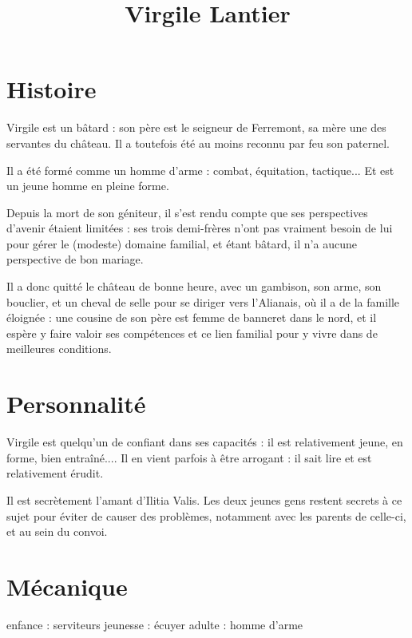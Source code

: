 \documentclass[10pt,a4paper]{article}
\title{Virgile Lantier}
\begin{document}
\section{Histoire}
Virgile est un bâtard : son père est le seigneur de Ferremont, sa mère une des servantes du château. Il a toutefois été au moins reconnu par feu son paternel.

Il a été formé comme un homme d'arme : combat, équitation, tactique... Et est un jeune homme en pleine forme.

Depuis la mort de son géniteur, il s'est rendu compte que ses perspectives d'avenir étaient limitées : ses trois demi-frères n'ont pas vraiment besoin de lui pour gérer le (modeste) domaine familial, et étant bâtard, il n'a aucune perspective de bon mariage.

Il a donc quitté le château de bonne heure, avec un gambison, son arme, son bouclier, et un cheval de selle pour se diriger vers l'Alianais, où il a de la famille éloignée : une cousine de son père est femme de banneret dans le nord, et il espère y faire valoir ses compétences et ce lien familial pour y vivre dans de meilleures conditions.
\section{Personnalité}
Virgile est quelqu'un de confiant dans ses capacités : il est relativement jeune, en forme, bien entraîné.... Il en vient parfois à être arrogant : il sait lire et est relativement érudit.

Il est secrètement l'amant d'Ilitia Valis. Les deux jeunes gens restent secrets à ce sujet pour éviter de causer des problèmes, notamment avec les parents de celle-ci, et au sein du convoi.
\section{Mécanique}
enfance : serviteurs
jeunesse : écuyer
adulte : homme d'arme
\end{document}
